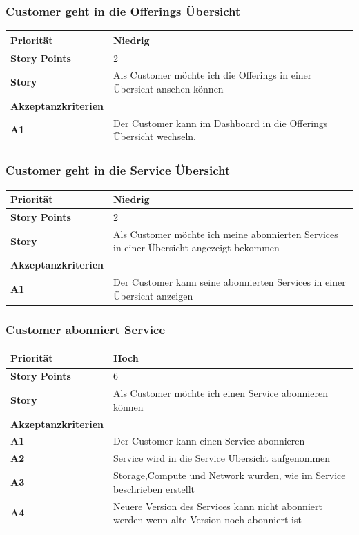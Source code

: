 \documentclass[11pt]{scrartcl}
\begin{document}
 \subsubsection{Customer geht in die Offerings Übersicht}
\begin{tabularx}{\linewidth}{l X}
  \textbf{Priorität} & Niedrig\\
  \hline
  \textbf{Story Points} & 2\\
  \hline
  \textbf{Story}& Als Customer möchte ich die Offerings in einer Übersicht ansehen können\\
  \hline
    \textbf{Akzeptanzkriterien} & \\
    \hline
  \textbf{A1} & Der Customer kann im Dashboard in die Offerings Übersicht wechseln.\\
  \hline
   \end{tabularx}
   
 \subsubsection{Customer geht in die Service Übersicht}
\begin{tabularx}{\linewidth}{l X}
  \textbf{Priorität} & Niedrig\\
  \hline
  \textbf{Story Points} & 2\\
  \hline
  \textbf{Story}& Als Customer möchte ich meine abonnierten Services in einer Übersicht angezeigt bekommen\\
  \hline
    \textbf{Akzeptanzkriterien} & \\
    \hline
  \textbf{A1} & Der Customer kann seine abonnierten Services in einer Übersicht anzeigen\\
  \hline
   \end{tabularx}
   

 \subsubsection{Customer abonniert Service}
\begin{tabularx}{\linewidth}{l X}
  \textbf{Priorität} & Hoch\\
  \hline
  \textbf{Story Points} & 6\\
  \hline
  \textbf{Story}& Als Customer möchte ich einen Service abonnieren können\\
  \hline
    \textbf{Akzeptanzkriterien} & \\
    \hline
  \textbf{A1} & Der Customer kann einen Service abonnieren\\
  \hline
  \textbf{A2} & Service wird in die Service Übersicht aufgenommen\\
  \hline
    \textbf{A3} & Storage,Compute und Network wurden, wie im Service beschrieben erstellt\\
  \hline
      \textbf{A4} & Neuere Version des Services kann nicht abonniert werden wenn alte Version noch abonniert ist\\
  \hline
   \end{tabularx}
\end{document}
